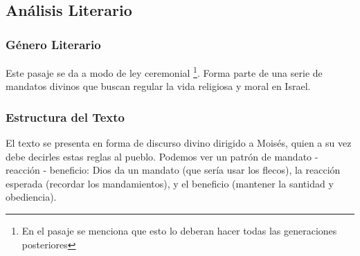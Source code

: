 \begin{multicols}{2}
\subsection{Análisis Literario}

\subsubsection{Género Literario}
Este pasaje se da a modo de ley ceremonial \footnote{En el pasaje se menciona que esto lo deberan hacer todas las generaciones posteriores}. Forma parte de una serie de mandatos divinos que buscan regular la vida religiosa y moral en Israel.

\subsubsection{Estructura del Texto}
El texto se presenta en forma de discurso divino dirigido a Moisés, quien a su vez debe decirles estas reglas al pueblo. Podemos ver un patrón de mandato - reacción - beneficio: Dios da un mandato (que sería usar los flecos), la reacción esperada (recordar los mandamientos), y el beneficio (mantener la santidad y obediencia).

\end{multicols}
